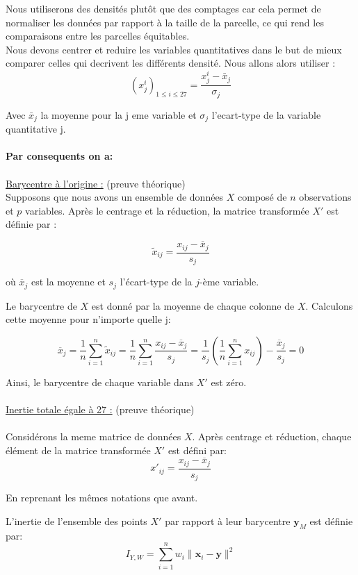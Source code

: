 \documentclass{article}
\begin{document}
Nous utiliserons des densités plutôt que des comptages car cela permet de normaliser les données par rapport à la taille de la parcelle,
ce qui rend les comparaisons entre les parcelles équitables.
\\
Nous devons centrer et reduire les variables quantitatives dans le but de mieux comparer celles qui decrivent les différents densité.
Nous allons alors utiliser :
\[
(x_j^i)_{1 \leq i \leq 27} = \frac{x_j^i - \bar{x}_j}{\sigma_j}
\]

Avec $\bar{x}_j$ la moyenne pour la j eme variable et  $\sigma_j$ l'ecart-type de la variable quantitative j.
\\
\\
\textbf{Par consequents on a:}
\\
\\
\underline{Barycentre à l'origine :} (preuve théorique)
\\

Supposons que nous avons un ensemble de données $X$ composé de $n$ observations et $p$ variables. Après le centrage et la réduction, la matrice transformée $X'$ est définie par :

\[
\tilde{x}_{ij} = \frac{x_{ij} - \overline{x}_j}{s_j}
\]

où $\overline{x}_j$ est la moyenne et $s_j$ l'écart-type de la $j$-ème variable.


Le barycentre de $X$ est donné par la moyenne de chaque colonne de $X$. Calculons cette moyenne pour n'importe quelle j:

\[
\overline{x}_j = \frac{1}{n} \sum_{i=1}^n \tilde{x}_{ij} = \frac{1}{n} \sum_{i=1}^n \frac{x_{ij} - \overline{x}_j}{s_j} = \frac{1}{s_j} \left(\frac{1}{n} \sum_{i=1}^n x_{ij}\right) - \frac{\overline{x}_j}{s_j} = 0
\]

Ainsi, le barycentre de chaque variable dans $X'$ est zéro.
\\
\\

\underline{Inertie totale égale à 27 :} (preuve théorique)
\\
\\
Considérons la meme matrice de données $X$. Après centrage et réduction, chaque élément de la matrice transformée $X'$ est défini par:
\[
x'_{ij} = \frac{x_{ij} - \overline{x}_j}{s_j}
\]

En reprenant les mêmes notations que avant.


L'inertie de l'ensemble des points $X'$ par rapport à leur barycentre $\mathbf{y}_M$ est définie par:
\[
I_{Y, W} = \sum_{i=1}^n w_i \|\mathbf{x}_i - \mathbf{y}\|^2
\]
\end{document}
